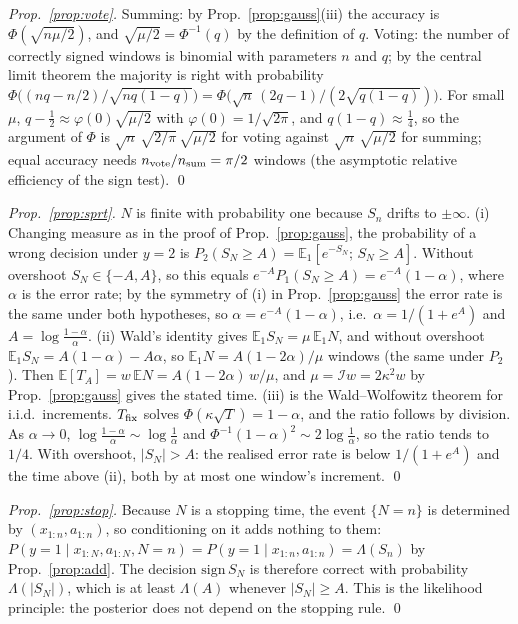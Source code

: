 \emph{Prop.~\ref{prop:vote}.} Summing: by Prop.~\ref{prop:gauss}(iii) the accuracy is
$\Phi(\sqrt{n\mu/2})$, and $\sqrt{\mu/2}=\Phi^{-1}(q)$ by the definition of $q$. Voting: the
number of correctly signed windows is binomial with parameters $n$ and $q$; by the central limit
theorem the majority is right with probability
$\Phi\big((nq-n/2)/\sqrt{nq(1-q)}\big)=\Phi\big(\sqrt n\,(2q-1)/(2\sqrt{q(1-q)})\big)$. For small
$\mu$, $q-\tfrac12\approx\varphi(0)\sqrt{\mu/2}$ with $\varphi(0)=1/\sqrt{2\pi}$, and
$q(1-q)\approx\tfrac14$, so the argument of $\Phi$ is $\sqrt n\,\sqrt{2/\pi}\,\sqrt{\mu/2}$ for
voting against $\sqrt n\,\sqrt{\mu/2}$ for summing; equal accuracy needs
$n_{\rm vote}/n_{\rm sum}=\pi/2$ windows (the asymptotic relative efficiency of the sign test).
\qed

\emph{Prop.~\ref{prop:sprt}.} $N$ is finite with probability one because $S_n$ drifts to
$\pm\infty$. (i) Changing measure as in the proof of Prop.~\ref{prop:gauss}, the probability of
a wrong decision under $y{=}2$ is $P_2(S_N\ge A)=\mathbb E_1[e^{-S_N};\,S_N\ge A]$. Without
overshoot $S_N\in\{-A,A\}$, so this equals $e^{-A}P_1(S_N\ge A)=e^{-A}(1-\alpha)$, where
$\alpha$ is the error rate; by the symmetry of (i) in Prop.~\ref{prop:gauss} the error rate is
the same under both hypotheses, so $\alpha=e^{-A}(1-\alpha)$, i.e.\ $\alpha=1/(1+e^A)$ and
$A=\log\frac{1-\alpha}{\alpha}$. (ii) Wald's identity gives $\mathbb E_1S_N=\mu\,\mathbb E_1N$,
and without overshoot $\mathbb E_1S_N=A(1-\alpha)-A\alpha$, so
$\mathbb E_1N=A(1-2\alpha)/\mu$ windows (the same under $P_2$). Then
$\mathbb E[T_A]=w\,\mathbb E N=A(1-2\alpha)\,w/\mu$, and $\mu=\mathcal I w=2\kappa^2w$ by
Prop.~\ref{prop:gauss} gives the stated time. (iii) is the Wald--Wolfowitz theorem for i.i.d.\
increments. $T_{\rm fix}$ solves $\Phi(\kappa\sqrt{T})=1-\alpha$, and the ratio follows by
division. As $\alpha\to0$, $\log\frac{1-\alpha}{\alpha}\sim\log\frac1\alpha$ and
$\Phi^{-1}(1-\alpha)^2\sim2\log\frac1\alpha$, so the ratio tends to $1/4$. With overshoot,
$|S_N|>A$: the realised error rate is below $1/(1+e^A)$ and the time above (ii), both by at
most one window's increment. \qed

\emph{Prop.~\ref{prop:stop}.} Because $N$ is a stopping time, the event $\{N=n\}$ is
determined by $(x_{1:n},a_{1:n})$, so conditioning on it adds nothing to them:
$P(y{=}1\mid x_{1:N},a_{1:N},N{=}n)=P(y{=}1\mid x_{1:n},a_{1:n})=\Lambda(S_n)$ by
Prop.~\ref{prop:add}. The decision $\mathrm{sign}\,S_N$ is therefore correct with probability
$\Lambda(|S_N|)$, which is at least $\Lambda(A)$ whenever $|S_N|\ge A$. This is the likelihood
principle: the posterior does not depend on the stopping rule. \qed


